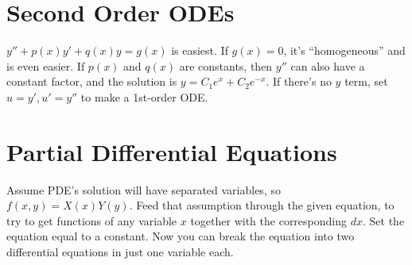 \section{Second Order ODEs}

$ y'' + p(x)y' + q(x)y = g(x) $ is easiest. If $g(x) = 0$, it's
``homogeneous'' and is even easier. If $p(x)$ and $q(x)$ are
constants, then $y''$ can also have a constant factor, and the
solution is $ y = C_1e^x + C_2e^{-x} $. If there's no $y$ term, set
$u = y', u' = y''$ to make a 1st-order ODE.

\section{Partial Differential Equations}

Assume PDE's solution will have separated variables, so $ f(x, y) =
X(x)Y(y) $. Feed that assumption through the given equation, to try to
get functions of any variable $x$ together with the corresponding
$dx$. Set the equation equal to a constant. Now you can break the
equation into two differential equations in just one variable each.
